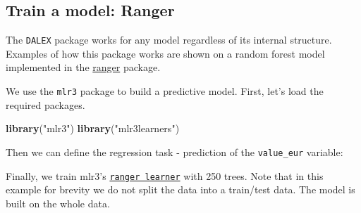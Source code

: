 \documentclass[]{scrbook}
\newenvironment{Shaded}{\begin{snugshade}}{\end{snugshade}}
\newcommand{\DataTypeTok}[1]{\textcolor[rgb]{0.13,0.29,0.53}{#1}}
\newcommand{\DecValTok}[1]{\textcolor[rgb]{0.00,0.00,0.81}{#1}}
\newcommand{\KeywordTok}[1]{\textcolor[rgb]{0.13,0.29,0.53}{\textbf{#1}}}
\newcommand{\NormalTok}[1]{#1}
\newcommand{\OperatorTok}[1]{\textcolor[rgb]{0.81,0.36,0.00}{\textbf{#1}}}
\newcommand{\StringTok}[1]{\textcolor[rgb]{0.31,0.60,0.02}{#1}}
\renewenvironment{Shaded} {\begin{snugshade}\small} {\end{snugshade}}
\begin{document}
\hypertarget{interpretability-train-ranger}{%
\subsection{Train a model: Ranger}\label{interpretability-train-ranger}}

The \texttt{DALEX} package works for any model regardless of its internal structure. Examples of how this package works are shown on a random forest model implemented in the \href{https://cran.r-project.org/package=ranger}{ranger} package.

We use the \texttt{mlr3} package to build a predictive model.
First, let's load the required packages.

\begin{Shaded}
\begin{Highlighting}[]
\KeywordTok{library}\NormalTok{(}\StringTok{"mlr3"}\NormalTok{)}
\KeywordTok{library}\NormalTok{(}\StringTok{"mlr3learners"}\NormalTok{)}
\end{Highlighting}
\end{Shaded}

Then we can define the regression task - prediction of the \texttt{value\_eur} variable:

\begin{Shaded}
\end{Shaded}

Finally, we train mlr3's \href{https://mlr3learners.mlr-org.com/reference/mlr_learners_regr.ranger.html}{\texttt{ranger\ learner}} with 250 trees. Note that in this example for brevity we do not split the data into a train/test data. The model is built on the whole data.

\begin{Shaded}
\end{Shaded}
\end{document}
